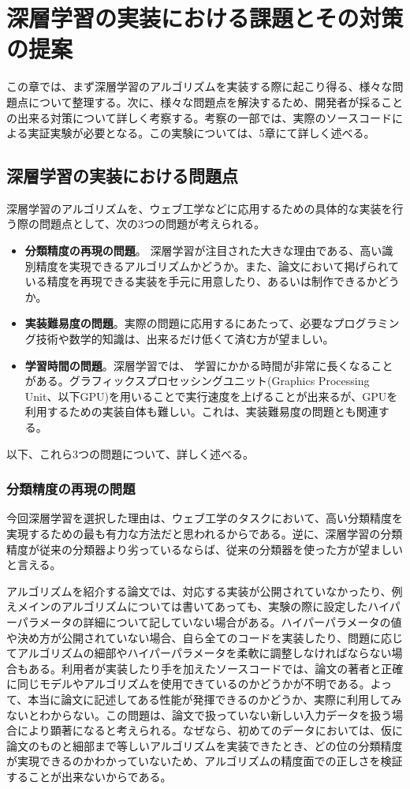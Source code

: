\chapter{深層学習の実装における課題とその対策の提案}
この章では、まず深層学習のアルゴリズムを実装する際に起こり得る、様々な問題点について整理する。次に、様々な問題点を解決するため、開発者が採ることの出来る対策について詳しく考察する。考察の一部では、実際のソースコードによる実証実験が必要となる。この実験については、5章にて詳しく述べる。

\section{深層学習の実装における問題点}
深層学習のアルゴリズムを、ウェブ工学などに応用するための具体的な実装を行う際の問題点として、次の3つの問題が考えられる。
\begin{itemize}
\item \textbf{分類精度の再現の問題}。 深層学習が注目された大きな理由である、高い識別精度を実現できるアルゴリズムかどうか。また、論文において掲げられている精度を再現できる実装を手元に用意したり、あるいは制作できるかどうか。
\item \textbf{実装難易度の問題}。実際の問題に応用するにあたって、必要なプログラミング技術や数学的知識は、出来るだけ低くて済む方が望ましい。
\item \textbf{学習時間の問題}。深層学習では、 学習にかかる時間が非常に長くなることがある。グラフィックスプロセッシングユニット(Graphics Processing Unit、以下GPU)を用いることで実行速度を上げることが出来るが、GPUを利用するための実装自体も難しい。これは、実装難易度の問題とも関連する。
\end{itemize}
以下、これら3つの問題について、詳しく述べる。

\subsection{分類精度の再現の問題}
今回深層学習を選択した理由は、ウェブ工学のタスクにおいて、高い分類精度を実現するための最も有力な方法だと思われるからである。逆に、深層学習の分類精度が従来の分類器より劣っているならば、従来の分類器を使った方が望ましいと言える。\par
アルゴリズムを紹介する論文では、対応する実装が公開されていなかったり、例えメインのアルゴリズムについては書いてあっても、実験の際に設定したハイパーパラメータの詳細について記していない場合がある。ハイパーパラメータの値や決め方が公開されていない場合、自ら全てのコードを実装したり、問題に応じてアルゴリズムの細部やハイパーパラメータを柔軟に調整しなければならない場合もある。利用者が実装したり手を加えたソースコードでは、論文の著者と正確に同じモデルやアルゴリズムを使用できているのかどうかが不明である。よって、本当に論文に記述してある性能が発揮できるのかどうか、実際に利用してみないとわからない。この問題は、論文で扱っていない新しい入力データを扱う場合により顕著になると考えられる。なぜなら、初めてのデータにおいては、仮に論文のものと細部まで等しいアルゴリズムを実装できたとき、どの位の分類精度が実現できるのかわかっていないため、アルゴリズムの精度面での正しさを検証することが出来ないからである。\par

